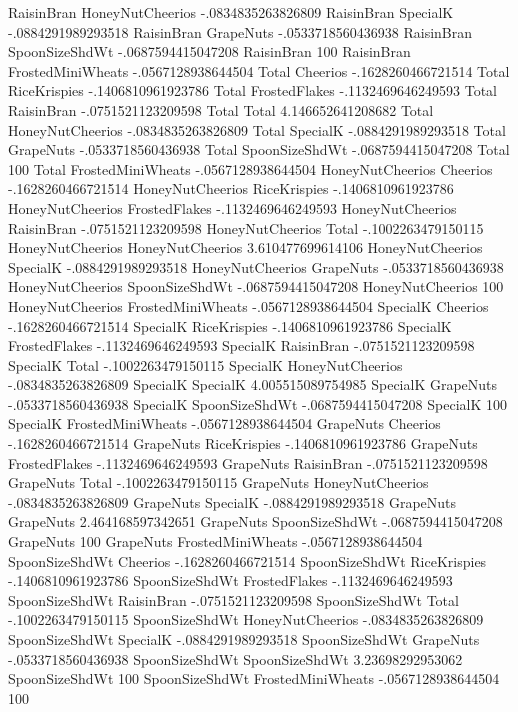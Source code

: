 RaisinBran	HoneyNutCheerios	-.0834835263826809
RaisinBran	SpecialK	-.0884291989293518
RaisinBran	GrapeNuts	-.0533718560436938
RaisinBran	SpoonSizeShdWt	-.0687594415047208
RaisinBran	100%
RaisinBran	FrostedMiniWheats	-.0567128938644504
Total	Cheerios	-.1628260466721514
Total	RiceKrispies	-.1406810961923786
Total	FrostedFlakes	-.1132469646249593
Total	RaisinBran	-.0751521123209598
Total	Total	4.146652641208682
Total	HoneyNutCheerios	-.0834835263826809
Total	SpecialK	-.0884291989293518
Total	GrapeNuts	-.0533718560436938
Total	SpoonSizeShdWt	-.0687594415047208
Total	100%
Total	FrostedMiniWheats	-.0567128938644504
HoneyNutCheerios	Cheerios	-.1628260466721514
HoneyNutCheerios	RiceKrispies	-.1406810961923786
HoneyNutCheerios	FrostedFlakes	-.1132469646249593
HoneyNutCheerios	RaisinBran	-.0751521123209598
HoneyNutCheerios	Total	-.1002263479150115
HoneyNutCheerios	HoneyNutCheerios	3.610477699614106
HoneyNutCheerios	SpecialK	-.0884291989293518
HoneyNutCheerios	GrapeNuts	-.0533718560436938
HoneyNutCheerios	SpoonSizeShdWt	-.0687594415047208
HoneyNutCheerios	100%
HoneyNutCheerios	FrostedMiniWheats	-.0567128938644504
SpecialK	Cheerios	-.1628260466721514
SpecialK	RiceKrispies	-.1406810961923786
SpecialK	FrostedFlakes	-.1132469646249593
SpecialK	RaisinBran	-.0751521123209598
SpecialK	Total	-.1002263479150115
SpecialK	HoneyNutCheerios	-.0834835263826809
SpecialK	SpecialK	4.005515089754985
SpecialK	GrapeNuts	-.0533718560436938
SpecialK	SpoonSizeShdWt	-.0687594415047208
SpecialK	100%
SpecialK	FrostedMiniWheats	-.0567128938644504
GrapeNuts	Cheerios	-.1628260466721514
GrapeNuts	RiceKrispies	-.1406810961923786
GrapeNuts	FrostedFlakes	-.1132469646249593
GrapeNuts	RaisinBran	-.0751521123209598
GrapeNuts	Total	-.1002263479150115
GrapeNuts	HoneyNutCheerios	-.0834835263826809
GrapeNuts	SpecialK	-.0884291989293518
GrapeNuts	GrapeNuts	2.464168597342651
GrapeNuts	SpoonSizeShdWt	-.0687594415047208
GrapeNuts	100%
GrapeNuts	FrostedMiniWheats	-.0567128938644504
SpoonSizeShdWt	Cheerios	-.1628260466721514
SpoonSizeShdWt	RiceKrispies	-.1406810961923786
SpoonSizeShdWt	FrostedFlakes	-.1132469646249593
SpoonSizeShdWt	RaisinBran	-.0751521123209598
SpoonSizeShdWt	Total	-.1002263479150115
SpoonSizeShdWt	HoneyNutCheerios	-.0834835263826809
SpoonSizeShdWt	SpecialK	-.0884291989293518
SpoonSizeShdWt	GrapeNuts	-.0533718560436938
SpoonSizeShdWt	SpoonSizeShdWt	3.23698292953062
SpoonSizeShdWt	100%
SpoonSizeShdWt	FrostedMiniWheats	-.0567128938644504
100%
